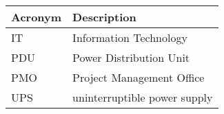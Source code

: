 \addtocounter{table}{-1}
\begin{longtable}{p{}p{}}\hline
\textbf{Acronym} & \textbf{Description}  \\\hline

IT & Information Technology \\\hline
PDU & Power Distribution Unit \\\hline
PMO & Project Management Office \\\hline
UPS & uninterruptible power supply \\\hline
\end{longtable}
